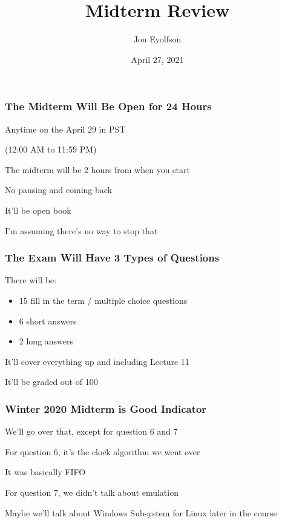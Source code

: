 

\title{Midterm Review}
\author{Jon Eyolfson}
\date{April 27, 2021}


  \begin{frame}
    \titlepage
  \end{frame}

  \begin{frame}
    \frametitle{The Midterm Will Be Open for 24 Hours}

    Anytime on the April 29 in PST

    \hspace{2em} (12:00 AM  to 11:59 PM)

    \vspace{2em}

    The midterm will be 2 hours from when you start

    \hspace{2em} No pausing and coming back

    \vspace{2em}

    It'll be open book

    \hspace{2em} I'm assuming there's no way to stop that
  \end{frame}

  \begin{frame}
    \frametitle{The Exam Will Have 3 Types of Questions}

    There will be:
    \begin{itemize}
      \item 15 fill in the term / multiple choice questions
      \item 6 short answers
      \item 2 long answers
    \end{itemize}

    \vspace{2em}

    It'll cover everything up and including Lecture 11

    \vspace{2em}

    It'll be graded out of 100
  \end{frame}

  \begin{frame}
    \frametitle{Winter 2020 Midterm is Good Indicator}

    We'll go over that, except for question 6 and 7

    \vspace{1em}

    For question 6, it's the clock algorithm we went over

    \hspace{2em} It was basically FIFO

    \vspace{1em}

    For question 7, we didn't talk about emulation

    \hspace{1em} Maybe we'll talk about Windows Subsystem for Linux later in the
    course
  \end{frame}

